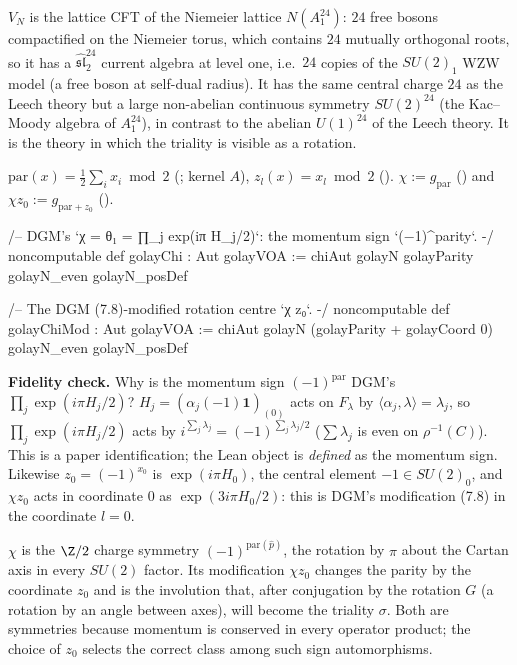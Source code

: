\begin{physics}
$V_N$ is the lattice CFT of the Niemeier lattice $N(A_1^{24})$: $24$ free bosons compactified on the Niemeier torus, which contains $24$ mutually orthogonal roots, so it has a $\widehat{\mathfrak{sl}}_2^{24}$ current algebra at level one, i.e.\ $24$ copies of the $SU(2)_1$ WZW model (a free boson at self-dual radius). It has the same central charge $24$ as the Leech theory but a large non-abelian continuous symmetry $SU(2)^{24}$ (the Kac--Moody algebra of $A_1^{24}$), in contrast to the abelian $U(1)^{24}$ of the Leech theory. It is the theory in which the triality is visible as a rotation.
\end{physics}

\begin{definition}\label{ch11:def:chi}
$\mathrm{par}(x)=\tfrac12\sum_i x_i\bmod2$ (; kernel $A$), $z_l(x)=x_l\bmod 2$
().  $\chi:=g_{\mathrm{par}}$ () and $\chi z_0:=g_{\mathrm{par}+z_0}$
().
\end{definition}
\begin{leancode}
/-- DGM's `χ = θ₁ = ∏_j exp(iπ H_j/2)`: the momentum sign `(−1)^{parity}`. -/
noncomputable def golayChi : Aut golayVOA := chiAut golayN golayParity golayN_even golayN_posDef

/-- The DGM (7.8)-modified rotation centre `χ z₀`. -/
noncomputable def golayChiMod : Aut golayVOA :=
  chiAut golayN (golayParity + golayCoord 0) golayN_even golayN_posDef
\end{leancode}
\begin{dictionary}
\textbf{Fidelity check.}  Why is the momentum sign $(-1)^{\mathrm{par}}$ DGM's
$\prod_j\exp(i\pi H_j/2)$?  $H_j=(\alpha_j(-1)\mathbf 1)_{(0)}$ acts on $F_\lambda$ by $\langle\alpha_j,\lambda\rangle
=\lambda_j$, so $\prod_j\exp(i\pi H_j/2)$ acts by $i^{\sum_j\lambda_j}=(-1)^{\sum_j\lambda_j/2}$
($\sum\lambda_j$ is even on $\rho^{-1}(C)$).  This is a paper identification; the Lean object is
\emph{defined} as the momentum sign.  Likewise $z_0=(-1)^{x_0}$ is $\exp(i\pi H_0)$, the central element
$-1\in SU(2)_0$, and $\chi z_0$ acts in coordinate $0$ as $\exp(3i\pi H_0/2)$: this is DGM's
modification (7.8) in the coordinate $l=0$.
\end{dictionary}

\begin{physics}
$\chi$ is the $\Z/2$ charge symmetry $(-1)^{\mathrm{par}(\hat p)}$, the rotation by $\pi$ about the Cartan axis in every $SU(2)$ factor. Its modification $\chi z_0$ changes the parity by the coordinate $z_0$ and is the involution that, after conjugation by the rotation $G$ (a rotation by an angle between axes), will become the triality $\sigma$. Both are symmetries because momentum is conserved in every operator product; the choice of $z_0$ selects the correct class among such sign automorphisms.
\end{physics}

